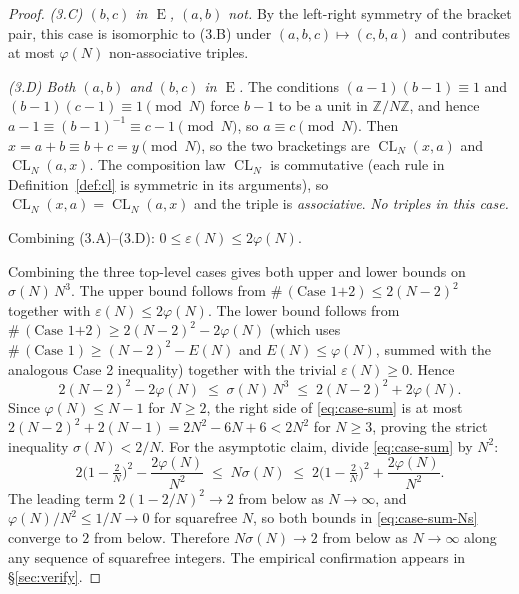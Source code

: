 \documentclass[11pt,reqno]{amsart}
\theoremstyle{plain}
\theoremstyle{definition}
\theoremstyle{remark}
\DeclareMathOperator{\CL}{CL}
\DeclareMathOperator{\ECHO}{E}
\newcommand{\ZN}{\mathbb{Z}/N\mathbb{Z}}
\begin{document}
\begin{proof}
\smallskip\noindent\textit{(3.C) $(b,c)$ in $\ECHO$, $(a,b)$ not.}
By the left-right symmetry of the bracket pair, this case is
isomorphic to (3.B) under $(a,b,c)\mapsto(c,b,a)$ and contributes
at most $\varphi(N)$ non-associative triples.

\smallskip\noindent\textit{(3.D) Both $(a,b)$ and $(b,c)$ in $\ECHO$.}
The conditions $(a-1)(b-1)\equiv 1$ and $(b-1)(c-1)\equiv 1\pmod N$
force $b-1$ to be a unit in $\ZN$, and hence
$a-1\equiv(b-1)^{-1}\equiv c-1\pmod N$, so $a\equiv c\pmod N$. Then
$x=a+b\equiv b+c=y\pmod N$, so the two bracketings are
$\CL_N(x,a)$ and $\CL_N(a,x)$. The composition law $\CL_N$ is
commutative (each rule in Definition~\ref{def:cl} is symmetric in
its arguments), so $\CL_N(x,a)=\CL_N(a,x)$ and the triple is
\emph{associative}. \emph{No triples in this case.}

\smallskip\noindent
Combining (3.A)--(3.D): $0\le\varepsilon(N)\le 2\varphi(N)$.

\medskip
Combining the three top-level cases gives both upper and lower
bounds on $\sigma(N)\,N^{3}$. The upper bound follows from
$\#\,(\text{Case 1+2}) \le 2(N-2)^{2}$ together with
$\varepsilon(N)\le 2\varphi(N)$. The lower bound follows from
$\#\,(\text{Case 1+2}) \ge 2(N-2)^{2} - 2\varphi(N)$
(which uses $\#\,(\text{Case 1}) \ge (N-2)^{2} - E(N)$ and
$E(N)\le \varphi(N)$, summed with the analogous Case 2 inequality)
together with the trivial $\varepsilon(N)\ge 0$. Hence
\begin{equation}\label{eq:case-sum}
  2(N-2)^{2}-2\varphi(N)\;\le\;\sigma(N)\,N^{3}\;\le\;2(N-2)^{2}+2\varphi(N).
\end{equation}
Since $\varphi(N)\le N-1$ for $N\ge 2$, the right side of
\eqref{eq:case-sum} is at most
$2(N-2)^{2}+2(N-1)=2N^{2}-6N+6<2N^{2}$ for $N\ge 3$, proving the
strict inequality $\sigma(N)<2/N$. For the asymptotic claim, divide
\eqref{eq:case-sum} by $N^{2}$:
\begin{equation}\label{eq:case-sum-Ns}
  2\bigl(1-\tfrac{2}{N}\bigr)^{2}-\frac{2\varphi(N)}{N^{2}}
  \;\le\;N\sigma(N)\;\le\;
  2\bigl(1-\tfrac{2}{N}\bigr)^{2}+\frac{2\varphi(N)}{N^{2}}.
\end{equation}
The leading term $2(1-2/N)^{2}\to 2$ from below as $N\to\infty$, and
$\varphi(N)/N^{2}\le 1/N\to 0$ for squarefree $N$, so both bounds in
\eqref{eq:case-sum-Ns} converge to $2$ from below. Therefore
$N\sigma(N)\to 2$ from below as $N\to\infty$ along any sequence of
squarefree integers. The empirical confirmation appears in
\S\ref{sec:verify}.
\end{proof}
\end{document}
